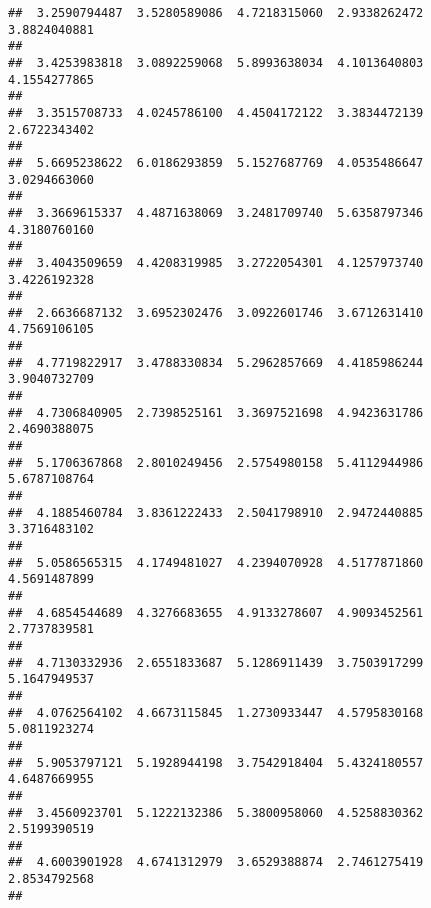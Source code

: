 \documentclass[]{article}
\begin{document}
\begin{verbatim}
##  3.2590794487  3.5280589086  4.7218315060  2.9338262472  3.8824040881 
##                                                                       
##  3.4253983818  3.0892259068  5.8993638034  4.1013640803  4.1554277865 
##                                                                       
##  3.3515708733  4.0245786100  4.4504172122  3.3834472139  2.6722343402 
##                                                                       
##  5.6695238622  6.0186293859  5.1527687769  4.0535486647  3.0294663060 
##                                                                       
##  3.3669615337  4.4871638069  3.2481709740  5.6358797346  4.3180760160 
##                                                                       
##  3.4043509659  4.4208319985  3.2722054301  4.1257973740  3.4226192328 
##                                                                       
##  2.6636687132  3.6952302476  3.0922601746  3.6712631410  4.7569106105 
##                                                                       
##  4.7719822917  3.4788330834  5.2962857669  4.4185986244  3.9040732709 
##                                                                       
##  4.7306840905  2.7398525161  3.3697521698  4.9423631786  2.4690388075 
##                                                                       
##  5.1706367868  2.8010249456  2.5754980158  5.4112944986  5.6787108764 
##                                                                       
##  4.1885460784  3.8361222433  2.5041798910  2.9472440885  3.3716483102 
##                                                                       
##  5.0586565315  4.1749481027  4.2394070928  4.5177871860  4.5691487899 
##                                                                       
##  4.6854544689  4.3276683655  4.9133278607  4.9093452561  2.7737839581 
##                                                                       
##  4.7130332936  2.6551833687  5.1286911439  3.7503917299  5.1647949537 
##                                                                       
##  4.0762564102  4.6673115845  1.2730933447  4.5795830168  5.0811923274 
##                                                                       
##  5.9053797121  5.1928944198  3.7542918404  5.4324180557  4.6487669955 
##                                                                       
##  3.4560923701  5.1222132386  5.3800958060  4.5258830362  2.5199390519 
##                                                                       
##  4.6003901928  4.6741312979  3.6529388874  2.7461275419  2.8534792568 
##                                                                       

\end{verbatim}
\end{document}

